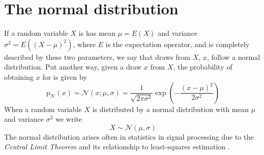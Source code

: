 \chapter{The normal distribution\label{chap:normaldist}}

If a random variable $X$ is has mean $\mu = E(X)$ and variance $\sigma^{2} =
E((X-\mu)^{2})$, where $E$ is the expectation operator, and is completely
described by these two parameters, we say that draws from $X$, $x$, follow a
normal distribution. Put another way, given a draw $x$ from $X$, the probability of
obtaining $x$ for is given by
\begin{equation}
    \mathrm{p}_{\mathcal{N}}(x)
    =
    \mathcal{N}(x;\mu,\sigma)
    =
    \frac{1}{\sqrt{2\pi\sigma^{2}}}\exp(-\frac{(x-\mu)^{2}}{2\sigma^{2}})
\end{equation}
When a random variable $X$ is distributed by a normal distribution with mean $\mu$
and variance $\sigma^{2}$ we write
\[
    X \sim \mathcal{N}(\mu,\sigma)
\]
The normal distribution arises often in statistics in signal processing due to
the \textit{Central Limit Theorem} \cite{feller2008introduction} and its
relationship to least-squares estimation \cite{kay1993fundamentals}.
